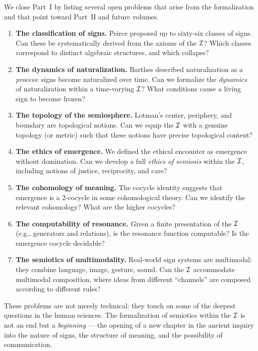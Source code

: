 We close Part~I by listing several open problems that arise from the
formalization and that point toward Part~II and future volumes.

\begin{enumerate}
\item \textbf{The classification of signs.} Peirce proposed up to
sixty-six classes of signs. Can these be systematically derived
from the axioms of the $\mathcal{I}$? Which classes correspond to distinct
algebraic structures, and which collapse?

\item \textbf{The dynamics of naturalization.} Barthes described
naturalization as a \emph{process}: signs become naturalized over
time. Can we formalize the \emph{dynamics} of naturalization within
a time-varying $\mathcal{I}$? What conditions cause a living sign to become
frozen?

\item \textbf{The topology of the semiosphere.} Lotman's center,
periphery, and boundary are topological notions. Can we equip the
$\mathcal{I}$ with a genuine topology (or metric) such that these notions
have precise topological content?

\item \textbf{The ethics of emergence.} We defined the ethical
encounter as emergence without domination. Can we develop a full
\emph{ethics of semiosis} within the $\mathcal{I}$, including notions of
justice, reciprocity, and care?

\item \textbf{The cohomology of meaning.} The cocycle identity
suggests that emergence is a $2$-cocycle in some cohomological
theory. Can we identify the relevant cohomology? What are the
higher cocycles?

\item \textbf{The computability of resonance.} Given a finite
presentation of the $\mathcal{I}$ (e.g., generators and relations), is
the resonance function computable? Is the emergence cocycle
decidable?

\item \textbf{The semiotics of multimodality.} Real-world sign
systems are multimodal: they combine language, image, gesture,
sound. Can the $\mathcal{I}$ accommodate multimodal composition, where
ideas from different ``channels'' are composed according to
different rules?
\end{enumerate}

These problems are not merely technical: they touch on some of the
deepest questions in the human sciences. The formalization of semiotics
within the $\mathcal{I}$ is not an end but a \emph{beginning} --- the opening
of a new chapter in the ancient inquiry into the nature of signs, the
structure of meaning, and the possibility of communication.

